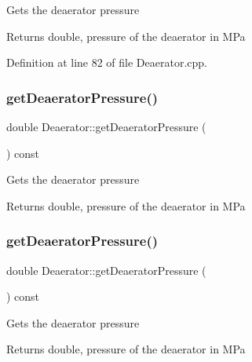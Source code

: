 Gets the deaerator pressure \begin{DoxyReturn}{Returns}
double, pressure of the deaerator in M\+Pa 
\end{DoxyReturn}


Definition at line 82 of file Deaerator.\+cpp.

\mbox{\label{class_deaerator_ac16cacdeef74e45f951fe992bac4e9e3}} 
\subsubsection{\texorpdfstring{get\+Deaerator\+Pressure()}{getDeaeratorPressure()}\hspace{0.1cm}{\footnotesize\ttfamily [2/3]}}
{\footnotesize\ttfamily double Deaerator\+::get\+Deaerator\+Pressure (\begin{DoxyParamCaption}{ }\end{DoxyParamCaption}) const}

Gets the deaerator pressure \begin{DoxyReturn}{Returns}
double, pressure of the deaerator in M\+Pa 
\end{DoxyReturn}
\mbox{\label{class_deaerator_ac16cacdeef74e45f951fe992bac4e9e3}} 
\subsubsection{\texorpdfstring{get\+Deaerator\+Pressure()}{getDeaeratorPressure()}\hspace{0.1cm}{\footnotesize\ttfamily [3/3]}}
{\footnotesize\ttfamily double Deaerator\+::get\+Deaerator\+Pressure (\begin{DoxyParamCaption}{ }\end{DoxyParamCaption}) const}

Gets the deaerator pressure \begin{DoxyReturn}{Returns}
double, pressure of the deaerator in M\+Pa 
\end{DoxyReturn}
\mbox{\label{class_deaerator_ae1524e8b406c3d5c2823ae4e6bafe389}} 
